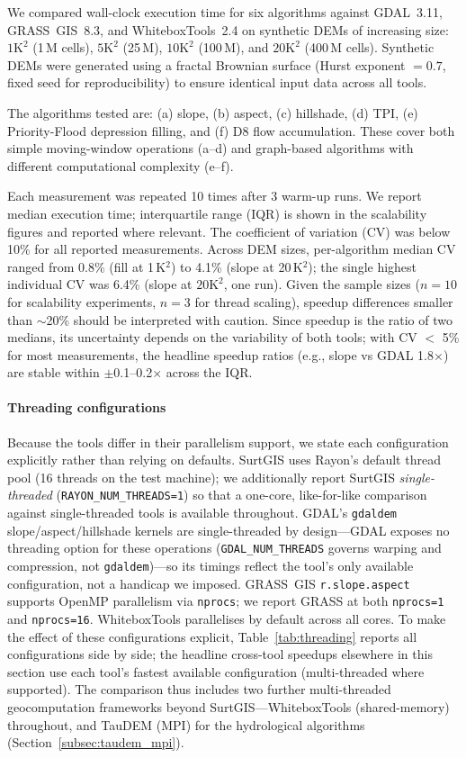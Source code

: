 \documentclass[preprint,review,12pt,authoryear]{elsarticle}
\newif\ifmarkedrev
\newcommand{\revtext}[1]{\ifmarkedrev\textcolor{blue}{#1}\else#1\fi}
\begin{document}
We compared wall-clock execution time for six algorithms against GDAL~3.11, GRASS~GIS~8.3, and WhiteboxTools~2.4 on synthetic DEMs of increasing size: $1\text{K}^2$ (1\,M cells), $5\text{K}^2$ (25\,M), $10\text{K}^2$ (100\,M), and $20\text{K}^2$ (400\,M cells). Synthetic DEMs were generated using a fractal Brownian surface (Hurst exponent $= 0.7$, fixed seed for reproducibility) to ensure identical input data across all tools.

The algorithms tested are: (a) slope, (b) aspect, (c) hillshade, (d) TPI, (e) Priority-Flood depression filling, and (f) D8 flow accumulation. These cover both simple moving-window operations (a--d) and graph-based algorithms with different computational complexity (e--f).

Each measurement was repeated 10 times after 3 warm-up runs. We report median execution time; interquartile range (IQR) is shown in the scalability figures and reported where relevant. The coefficient of variation (CV) was below 10\% for all reported measurements. Across DEM sizes, per-algorithm median CV ranged from 0.8\% (fill at 1\,K$^2$) to 4.1\% (slope at 20\,K$^2$); the single highest individual CV was 6.4\% (slope at $20\text{K}^2$, one run). Given the sample sizes ($n=10$ for scalability experiments, $n=3$ for thread scaling), speedup differences smaller than $\sim$20\% should be interpreted with caution. Since speedup is the ratio of two medians, its uncertainty depends on the variability of both tools; with CV $<$ 5\% for most measurements, the headline speedup ratios (e.g., slope vs GDAL 1.8$\times$) are stable within $\pm$0.1--0.2$\times$ across the IQR.

\paragraph{\revtext{Threading configurations}} \revtext{Because the tools differ in their parallelism support, we state each configuration explicitly rather than relying on defaults. SurtGIS uses Rayon's default thread pool (16 threads on the test machine); we additionally report SurtGIS \emph{single-threaded} (\texttt{RAYON\_NUM\_THREADS=1}) so that a one-core, like-for-like comparison against single-threaded tools is available throughout. GDAL's \texttt{gdaldem} slope/aspect/hillshade kernels are single-threaded by design---GDAL exposes no threading option for these operations (\texttt{GDAL\_NUM\_THREADS} governs warping and compression, not \texttt{gdaldem})---so its timings reflect the tool's only available configuration, not a handicap we imposed. GRASS~GIS \texttt{r.slope.aspect} supports OpenMP parallelism via \texttt{nprocs}; we report GRASS at both \texttt{nprocs=1} and \texttt{nprocs=16}. WhiteboxTools parallelises by default across all cores. To make the effect of these configurations explicit, Table~\ref{tab:threading} reports all configurations side by side; the headline cross-tool speedups elsewhere in this section use each tool's fastest available configuration (multi-threaded where supported). The comparison thus includes two further multi-threaded geocomputation frameworks beyond SurtGIS---WhiteboxTools (shared-memory) throughout, and TauDEM (MPI) for the hydrological algorithms (Section~\ref{subsec:taudem_mpi}).}
\end{document}
